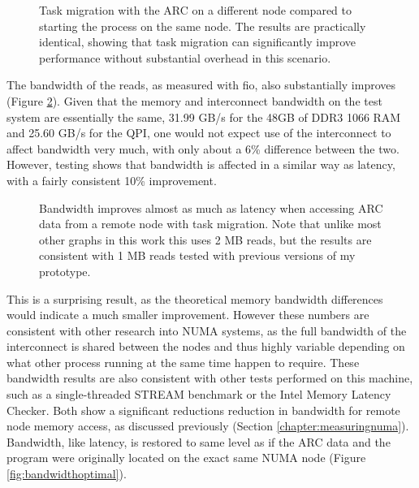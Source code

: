 \begin{figure}[H]
    \centering
    \resizebox{0.75\linewidth}{!}{}
    \captionsetup{width=0.75\linewidth}
    \caption{Task migration with the ARC on a different node compared to starting the process on the same node.
        The results are practically identical, showing that task migration can significantly improve performance without substantial
        overhead in this scenario.}
    \label{fig:optimal}
\end{figure}

The bandwidth of the reads, as measured with fio, also substantially improves (Figure \ref{fig:bandwidth}).
Given that the memory and interconnect bandwidth on the test system are essentially the same,
31.99 GB/s for the 48GB of DDR3 1066 RAM and 25.60 GB/s for the QPI, one would not expect use of the interconnect to affect bandwidth very much, with only about a 6\% difference between the two\cite{kochhar_optimal_2009}.
However, testing shows that bandwidth is affected in a similar way as latency, with a fairly consistent 10\% improvement.

\begin{figure}[H]
    \centering
    \resizebox{0.75\linewidth}{!}{}
    \captionsetup{width=0.75\linewidth}
    \caption{Bandwidth improves almost as much as latency when accessing ARC data from a remote node
        with task migration.
        Note that unlike most other graphs in this work this uses 2 MB reads,
        but the results are consistent with 1 MB reads tested with previous versions of my prototype.}
    \label{fig:bandwidth}
\end{figure}

This is a surprising result, as the theoretical memory bandwidth differences would indicate a much smaller improvement.
However these numbers are consistent with other research into NUMA systems, 
as the full bandwidth of the interconnect is shared between the nodes and thus highly variable
depending on what other process running at the same time happen to require\cite{bergstrom_stream,li_characterization_2013,song_evaluation_2017}.
These bandwidth results are also consistent with
other tests performed on this machine, such as a single-threaded STREAM benchmark or the Intel Memory Latency
Checker.
Both show a significant reductions reduction in bandwidth for remote node memory access, as discussed 
previously (Section \ref{chapter:measuringnuma}).
Bandwidth, like latency, is restored to same level as if the ARC data and the program were originally
located on the exact same NUMA node (Figure \ref{fig:bandwidthoptimal}).

